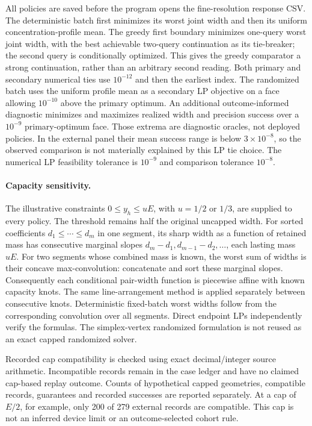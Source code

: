 All policies are saved before the program opens the fine-resolution response
CSV. The deterministic batch first minimizes its worst joint width and then
its uniform concentration-profile mean. The greedy first boundary minimizes
one-query worst joint width, with the best achievable two-query continuation
as its tie-breaker; the second query is conditionally optimized. This gives
the greedy comparator a strong continuation, rather than an arbitrary second
reading. Both primary and secondary numerical ties use $10^{-12}$ and then
the earliest index. The randomized batch uses the uniform profile mean as a
secondary LP objective on a face allowing $10^{-10}$ above the primary
optimum. An additional outcome-informed diagnostic minimizes and maximizes
realized width and precision success over a $10^{-9}$ primary-optimum face.
Those extrema are diagnostic oracles, not deployed policies. In the external
panel their mean success range is below $3\times10^{-8}$, so the observed
comparison is not materially explained by this LP tie choice. The numerical
LP feasibility tolerance is $10^{-9}$ and comparison tolerance $10^{-8}$.

\paragraph{Capacity sensitivity.}
The illustrative constraints $0\leq y_h\leq uE$, with $u=1/2$ or $1/3$,
are supplied to every policy. The threshold remains half the original
uncapped width. For sorted coefficients $d_1\leq\cdots\leq d_m$ in one
segment, its sharp width as a function of retained mass has consecutive
marginal slopes $d_m-d_1,d_{m-1}-d_2,\ldots$, each lasting mass $uE$.
For two segments whose combined mass is known, the worst sum of widths is
their concave max-convolution: concatenate and sort these marginal slopes.
Consequently each conditional pair-width function is piecewise affine with
known capacity knots. The same line-arrangement method is applied separately
between consecutive knots. Deterministic fixed-batch worst widths follow
from the corresponding convolution over all segments. Direct endpoint LPs
independently verify the formulas. The simplex-vertex randomized formulation
is not reused as an exact capped randomized solver.

Recorded cap compatibility is checked using exact decimal/integer source
arithmetic. Incompatible records remain in the case ledger and have no
claimed cap-based replay outcome. Counts of hypothetical capped geometries,
compatible records, guarantees and recorded successes are reported separately.
At a cap of $E/2$, for example, only 200 of 279 external records are compatible.
This cap is not an inferred device limit or an outcome-selected cohort rule.


